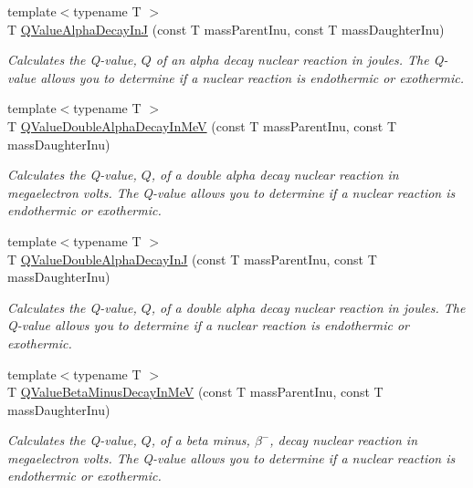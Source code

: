 \begin{DoxyCompactItemize}
{\footnotesize template$<$typename T $>$ }\\T \mbox{\hyperlink{group___e_g_x_phys-_q_value-_alpha_gab8a50c18f6de3c1b6ed280c26c3ff3a5}{Q\+Value\+Alpha\+Decay\+InJ}} (const T mass\+Parent\+Inu, const T mass\+Daughter\+Inu)
\begin{DoxyCompactList}\small\item\em Calculates the Q-\/value, $Q$ of an alpha decay nuclear reaction in joules. The Q-\/value allows you to determine if a nuclear reaction is endothermic or exothermic. \end{DoxyCompactList}\item 
{\footnotesize template$<$typename T $>$ }\\T \mbox{\hyperlink{group___e_g_x_phys-_q_value-_alpha_ga85230c793adc7fc78fef760874f75ad9}{Q\+Value\+Double\+Alpha\+Decay\+In\+MeV}} (const T mass\+Parent\+Inu, const T mass\+Daughter\+Inu)
\begin{DoxyCompactList}\small\item\em Calculates the Q-\/value, $Q$, of a double alpha decay nuclear reaction in megaelectron volts. The Q-\/value allows you to determine if a nuclear reaction is endothermic or exothermic. \end{DoxyCompactList}\item 
{\footnotesize template$<$typename T $>$ }\\T \mbox{\hyperlink{group___e_g_x_phys-_q_value-_alpha_ga015ade04346d0c6dae4dda8e3aab8cbd}{Q\+Value\+Double\+Alpha\+Decay\+InJ}} (const T mass\+Parent\+Inu, const T mass\+Daughter\+Inu)
\begin{DoxyCompactList}\small\item\em Calculates the Q-\/value, $Q$, of a double alpha decay nuclear reaction in joules. The Q-\/value allows you to determine if a nuclear reaction is endothermic or exothermic. \end{DoxyCompactList}\item 
{\footnotesize template$<$typename T $>$ }\\T \mbox{\hyperlink{group___e_g_x_phys-_q_value-_beta_minus_gaac1374ce9ba39bef416f34298708bda9}{Q\+Value\+Beta\+Minus\+Decay\+In\+MeV}} (const T mass\+Parent\+Inu, const T mass\+Daughter\+Inu)
\begin{DoxyCompactList}\small\item\em Calculates the Q-\/value, $Q$, of a beta minus, $\beta^-$, decay nuclear reaction in megaelectron volts. The Q-\/value allows you to determine if a nuclear reaction is endothermic or exothermic. \end{DoxyCompactList}\item 

\end{DoxyCompactItemize}
